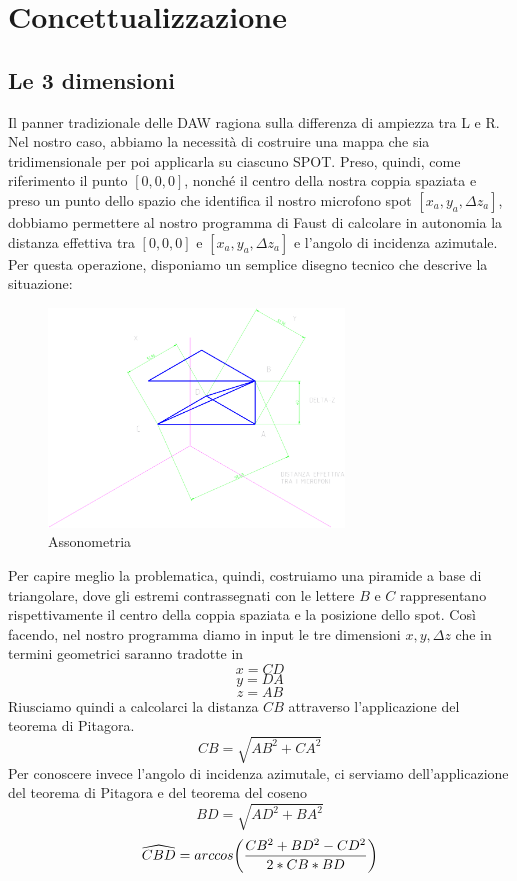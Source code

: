 \documentclass{article}
\begin{document}
\section{Concettualizzazione}

    \subsection{Le 3 dimensioni}
    Il panner tradizionale delle DAW ragiona sulla differenza di ampiezza tra L e R. Nel nostro caso, abbiamo la necessità di costruire una mappa che sia tridimensionale per poi applicarla su ciascuno SPOT. Preso, quindi, come riferimento il punto $\left[0,0,0\right]$, nonché il centro della nostra coppia spaziata e preso un punto dello spazio che identifica il nostro microfono spot $\left[x_a,y_a,\Delta z_a\right]$, dobbiamo permettere al nostro programma di Faust di calcolare in autonomia la distanza effettiva tra $\left[0,0,0\right]$ e $\left[x_a,y_a,\Delta z_a\right]$ e l'angolo di incidenza azimutale. Per questa operazione, disponiamo un semplice disegno tecnico che descrive la situazione:

    \begin{figure}[H]
        \centering
        \includegraphics[width=0.7\textwidth]{images/Assonometria.png}
         \caption{\label{fig1}Assonometria}
    \end{figure}

    Per capire meglio la problematica, quindi, costruiamo una piramide a base di triangolare, dove gli estremi contrassegnati con le lettere $B$ e $C$ rappresentano rispettivamente il centro della coppia spaziata e la posizione dello spot. Così facendo, nel nostro programma diamo in input le tre dimensioni $x, y, \Delta z$ che in termini geometrici saranno tradotte in
    $$x = CD$$
    $$y = DA$$
    $$z = AB$$
    Riusciamo quindi a calcolarci la distanza $CB$ attraverso l'applicazione del teorema di Pitagora.
    $$CB = \sqrt{AB^2 + CA ^ 2}$$
    Per conoscere invece l'angolo di incidenza azimutale, ci serviamo dell'applicazione del teorema di Pitagora e del teorema del coseno
    $$BD = \sqrt{AD^2 + BA ^ 2}$$
    $$\widehat{CBD} = arccos \biggl( {CB ^ 2 + BD ^ 2 - CD ^ 2\over 2 * CB * BD} \biggr)$$
\end{document}
